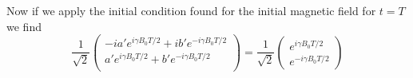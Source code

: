 \documentclass[11pt]{article}
\numberwithin{equation}{section}
\begin{document}
Now if we apply the initial condition found for the initial magnetic field for $t=T$ we find
$$\frac{1}{\sqrt{2}}\left(\begin{array}{c}
                       -ia'e^{i\gamma B_0T/2} + ib'e^{-i\gamma B_0T/2}\\
                       a'e^{i\gamma B_0T/2} + b'e^{-i\gamma B_0T/2}\\
                                \end{array}\right)
= \frac{1}{\sqrt{2}}\left(\begin{array}{c}
                                    e^{i\gamma B_0T/2}\\ 
                                    e^{-i\gamma B_0T/2}
                               \end{array}\right)$$
\end{document}
